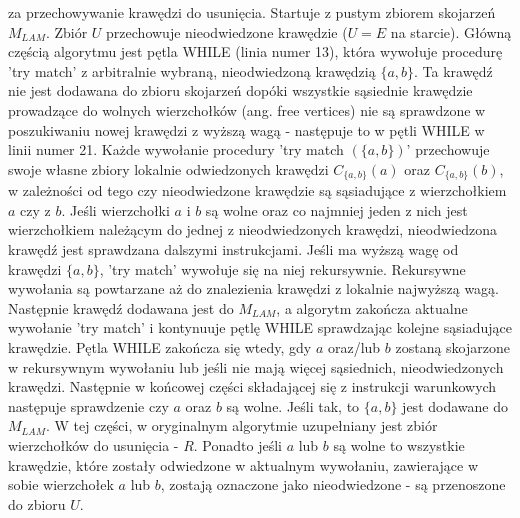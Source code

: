 za przechowywanie krawędzi do usunięcia.
Startuje z pustym zbiorem skojarzeń $M_{LAM}$.
Zbiór $U$ przechowuje nieodwiedzone krawędzie ($U = E$ na starcie).
Główną częścią algorytmu jest pętla WHILE (linia numer 13), która wywołuje
procedurę 'try match' z arbitralnie wybraną, nieodwiedzoną krawędzią $\{a,b\}$.
Ta krawędź nie jest dodawana do
zbioru skojarzeń dopóki wszystkie sąsiednie krawędzie prowadzące do wolnych wierzchołków (ang. free vertices) nie są sprawdzone
w poszukiwaniu nowej krawędzi z wyższą wagą - następuje to w pętli WHILE w linii numer 21.
Każde wywołanie procedury 'try match $(\{a,b\})$' przechowuje swoje własne zbiory lokalnie odwiedzonych krawędzi
$C_{\{a,b\}}(a)$ oraz $C_{\{a,b\}}(b)$, w zależności od tego czy nieodwiedzone krawędzie są sąsiadujące z wierzchołkiem
$a$ czy z $b$.
Jeśli wierzchołki $a$ i $b$ są wolne oraz co najmniej jeden z nich jest wierzchołkiem należącym do jednej z
nieodwiedzonych krawędzi, nieodwiedzona krawędź jest sprawdzana dalszymi instrukcjami.
Jeśli ma wyższą wagę od krawędzi $\{a,b\}$, 'try match' wywołuje się na niej rekursywnie.
Rekursywne wywołania są powtarzane aż do znalezienia krawędzi z lokalnie najwyższą wagą.
Następnie krawędź dodawana jest do $M_{LAM}$, a algorytm zakończa aktualne wywołanie 'try match' i kontynuuje
pętlę WHILE sprawdzając kolejne sąsiadujące krawędzie.
Pętla WHILE zakończa się wtedy, gdy $a$ oraz/lub $b$ zostaną skojarzone w rekursywnym wywołaniu lub jeśli nie mają więcej
sąsiednich, nieodwiedzonych krawędzi. Następnie w końcowej części składającej się z instrukcji warunkowych
następuje sprawdzenie czy $a$ oraz $b$
są wolne. Jeśli tak, to $\{a,b\}$ jest dodawane do $M_{LAM}$.
W tej części, w oryginalnym algorytmie uzupełniany jest zbiór
wierzchołków do usunięcia \cite{weighted_maching} - $R$.
Ponadto jeśli $a$ lub $b$ są wolne to wszystkie krawędzie, które zostały
odwiedzone w aktualnym wywołaniu, zawierające w sobie wierzchołek $a$ lub $b$, zostają oznaczone jako nieodwiedzone -
są przenoszone do zbioru $U$.

